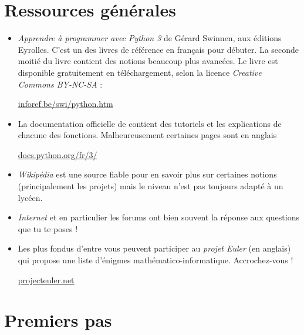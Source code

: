 \documentclass[11pt,class=report,crop=false]{standalone}
\begin{document}


\section*{Ressources générales}

\begin{itemize}
  \item \emph{Apprendre à programmer avec Python 3} de Gérard Swinnen, aux éditions Eyrolles.
   C'est un des livres de référence en français pour débuter. La seconde moitié du livre contient des notions beaucoup plus avancées. 
  Le livre est disponible gratuitement en téléchargement, selon la licence \emph{Creative Commons BY-NC-SA} :\\
  \centerline{
  \href{https://inforef.be/swi/python.htm}{inforef.be/swi/python.htm}
}
  \item La documentation officielle de \Python{} contient des tutoriels et les explications de chacune des fonctions. Malheureusement certaines pages sont en anglais\\
  \centerline{
\href{https://docs.python.org/fr/3/}{docs.python.org/fr/3/}
}  
  \item \emph{Wikipédia} est une source fiable pour en savoir plus sur certaines notions (principalement les projets) mais le niveau n'est pas toujours adapté à un lycéen.
  
  \item \emph{Internet} et en particulier les forums ont bien souvent la réponse aux questions que tu te poses ! 
  
  \item Les plus fondus d'entre vous peuvent participer au \emph{projet Euler} (en anglais) qui propose une liste d'énigmes mathématico-informatique. Accrochez-vous !\\
  \centerline{
  \href{https://projecteuler.net/}{projecteuler.net}
}  
\end{itemize}


\section{Premiers pas}
\end{document}

